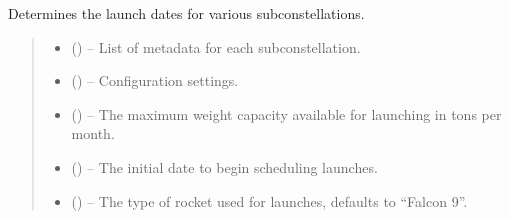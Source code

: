 \documentclass[letterpaper,10pt,english]{sphinxmanual}
\begin{document}

\begin{fulllineitems}
\label{\detokenize{fspsim.utils:fspsim.utils.LaunchModel.global_launch_schedule}}
\pysigstartsignatures
{}
\pysigstopsignatures
\sphinxAtStartPar
Determines the launch dates for various sub\sphinxhyphen{}constellations.
\begin{quote}\begin{description}
\begin{itemize}
\item {} 
\sphinxAtStartPar
{} (\sphinxstyleliteralemphasis{\sphinxupquote{{[}}}\sphinxstyleliteralemphasis{\sphinxupquote{{]}}}) – List of metadata for each sub\sphinxhyphen{}constellation.

\item {} 
\sphinxAtStartPar
{} () – Configuration settings.

\item {} 
\sphinxAtStartPar
{} () – The maximum weight capacity available for launching in tons per month.

\item {} 
\sphinxAtStartPar
{} () – The initial date to begin scheduling launches.

\item {} 
\sphinxAtStartPar
{} (\sphinxstyleliteralemphasis{\sphinxupquote{, }}) – The type of rocket used for launches, defaults to “Falcon 9”.


\end{itemize}
\end{description}
\end{quote}
\end{fulllineitems}
\end{document}
